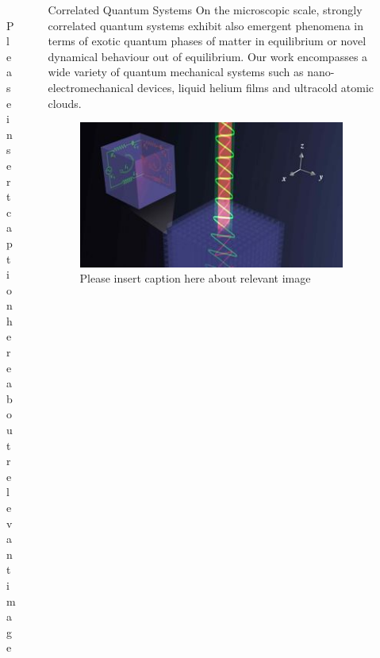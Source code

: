 \documentclass[xcolor={table}]{beamer}
\begin{document}
\begin{frame}[fragile=singleslide,t]
\begin{columns}[onlytextwidth,T]
\begin{column}{.47\textwidth}
\begin{figure}
    \centering
    \includegraphics[width=1.\columnwidth, height=0.2\textheight]{complexity.jpg}
    \caption{\footnotesize Please insert caption here about relevant image}
\end{figure}

\end{column}

\begin{column}{.47\textwidth}

\begin{block}{Correlated Quantum Systems}
On the microscopic scale, strongly correlated quantum systems exhibit also
emergent phenomena in terms of exotic quantum phases of matter in equilibrium or
novel dynamical behaviour out of equilibrium. Our work encompasses a wide
variety of quantum mechanical systems such as nano-electromechanical devices,
liquid helium films and ultracold atomic clouds.
\end{block}

\begin{figure}
    \includegraphics[width=1\columnwidth, height=0.2\textheight]{correlated.jpg}
    \caption{\footnotesize Please insert caption here about relevant image}
\end{figure}


\end{column}
\end{columns}
\end{frame}
\end{document}
